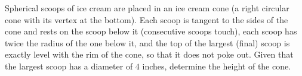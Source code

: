 Spherical scoops of ice cream are placed in an ice cream cone (a right circular cone with its vertex at the bottom). Each scoop is tangent to the sides of the cone and rests on the scoop below it (consecutive scoops touch), each scoop has twice the radius of the one below it, and the top of the largest (final) scoop is exactly level with the rim of the cone, so that it does not poke out. Given that the largest scoop has a diameter of $4$ inches, determine the height of the cone.
